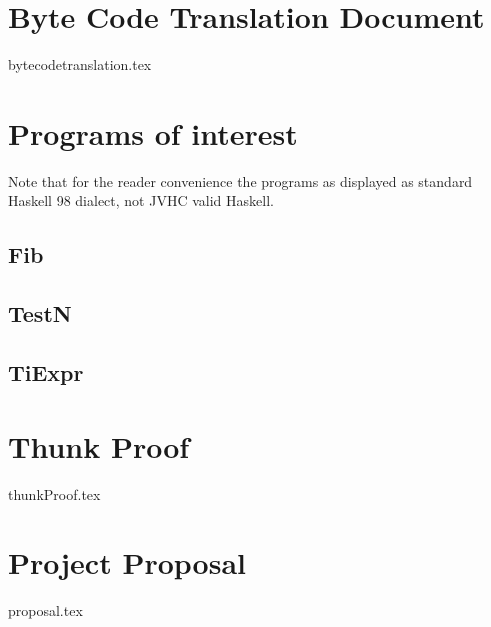 \documentclass[12pt,a4paper,twoside,openright]{book}
\numberwithin{subcase}{case}
\begin{document}
\chapter{Byte Code Translation Document}

\label{appendix:bytecodetranslationdoc}

{bytecodetranslation.tex}

\chapter{Programs of interest}

Note that for the reader convenience the programs as displayed as standard
Haskell 98 dialect, not JVHC valid Haskell.

\section*{Fib}

\section*{TestN}

\section*{TiExpr}


\label{appendix:programs}

\chapter{Thunk Proof}

{thunkProof.tex}

\label{appendix:thunkProof}

\chapter{Project Proposal}

{proposal.tex}

\label{appendix:proposal}
\end{document}

